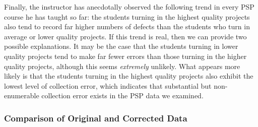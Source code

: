 Finally, the instructor has anecdotally observed the following trend in
every PSP course he has taught so far: the students turning in the highest
quality projects also tend to record far higher numbers of defects than the
students who turn in average or lower quality projects.  If this trend is
real, then we can provide two possible explanations. It may be the case
that the students turning in lower quality projects tend to make far fewer
errors than those turning in the higher quality projects, although this
seems {\em extremely} unlikely.  What appears more likely is that the
students turning in the highest quality projects also exhibit the lowest
level of collection error, which indicates that substantial but
non-enumerable collection error exists in the PSP data we examined.


\subsubsection{Comparison of Original and Corrected Data}


